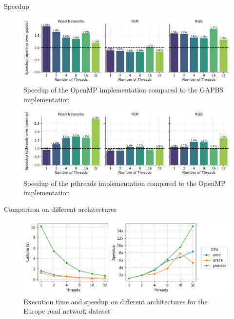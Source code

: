 \begin{frame}{Speedup}
\begin{figure}
  \centering
  \includegraphics[width=0.7\linewidth]{images/speedup_openmp.png}
  \vspace{-2mm}
  \caption{\footnotesize Speedup of the OpenMP implementation compared to the GAPBS implementation}
\end{figure}
\vspace{-5mm}
\begin{figure}
  \centering
  \includegraphics[width=0.7\linewidth]{images/speedup_pthreads.png}
  \vspace{-2mm}
  \caption{\footnotesize Speedup of the pthreads implementation compared to the OpenMP implementation}
\end{figure}
\end{frame}

\begin{frame}{Comparison on different architectures}
\centering
\begin{minipage}{0.8\linewidth}
\begin{figure}
  \includegraphics[width=\textwidth]{images/other_platforms.png}
  \caption{\centering Execution time and speedup on different architectures for the Europe road network dataset}
\end{figure}
\end{minipage}
\end{frame}